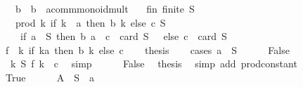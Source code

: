 \begin{isabellebody}
\ \ \ b\ {\isacharcolon}{\kern0pt}{\isacharcolon}{\kern0pt}\ {\isachardoublequoteopen}{\isacharprime}{\kern0pt}b\ {\isasymRightarrow}\ {\isacharprime}{\kern0pt}a{\isacharcolon}{\kern0pt}{\isacharcolon}{\kern0pt}comm{\isacharunderscore}{\kern0pt}monoid{\isacharunderscore}{\kern0pt}mult{\isachardoublequoteclose}\isanewline
\ \ \ fin{\isacharcolon}{\kern0pt}\ {\isachardoublequoteopen}finite\ S{\isachardoublequoteclose}\isanewline
\ \ \ {\isachardoublequoteopen}prod\ {\isacharparenleft}{\kern0pt}{\isasymlambda}k{\isachardot}{\kern0pt}\ if\ k\ {\isacharequal}{\kern0pt}\ a\ then\ b\ k\ else\ c{\isacharparenright}{\kern0pt}\ S\ {\isacharequal}{\kern0pt}\isanewline
\ \ \ \ {\isacharparenleft}{\kern0pt}if\ a\ {\isasymin}\ S\ then\ b\ a\ {\isacharasterisk}{\kern0pt}\ c\ {\isacharcircum}{\kern0pt}\ {\isacharparenleft}{\kern0pt}card\ S\ {\isacharminus}{\kern0pt}\ {}{\isacharparenright}{\kern0pt}\ else\ c\ {\isacharcircum}{\kern0pt}\ card\ S{\isacharparenright}{\kern0pt}{\isachardoublequoteclose}\isanewline
%
\isadelimproof
%
\endisadelimproof
%
\isatagproof
{}\isamarkupfalse%
\ {\isacharminus}{\kern0pt}\isanewline
\ \ \isamarkupfalse%
\ {\isacharquery}{\kern0pt}f\ {\isacharequal}{\kern0pt}\ {\isachardoublequoteopen}{\isacharparenleft}{\kern0pt}{\isasymlambda}k{\isachardot}{\kern0pt}\ if\ k{\isacharequal}{\kern0pt}a\ then\ b\ k\ else\ c{\isacharparenright}{\kern0pt}{\isachardoublequoteclose}\isanewline
\ \ \isamarkupfalse%
\ {\isacharquery}{\kern0pt}thesis\isanewline
\ \ \isamarkupfalse%
\ {\isacharparenleft}{\kern0pt}cases\ {\isachardoublequoteopen}a\ {\isasymin}\ S{\isachardoublequoteclose}{\isacharparenright}{\kern0pt}\isanewline
\ \ \ \ \isamarkupfalse%
\ False\isanewline
\ \ \ \ \isamarkupfalse%
\ \isamarkupfalse%
\ {\isachardoublequoteopen}{\isasymforall}\ k{\isasymin}\ S{\isachardot}{\kern0pt}\ {\isacharquery}{\kern0pt}f\ k\ {\isacharequal}{\kern0pt}\ c{\isachardoublequoteclose}\ \isamarkupfalse%
\ simp\isanewline
\ \ \ \ \isamarkupfalse%
\ False\ \isamarkupfalse%
\ {\isacharquery}{\kern0pt}thesis\ \isamarkupfalse%
\ {\isacharparenleft}{\kern0pt}simp\ add{\isacharcolon}{\kern0pt}\ prod{\isacharunderscore}{\kern0pt}constant{\isacharparenright}{\kern0pt}\isanewline
\ \ \isamarkupfalse%
\isanewline
\ \ \ \ \isamarkupfalse%
\ True\isanewline
\ \ \ \ \isamarkupfalse%
\ {\isacharquery}{\kern0pt}A\ {\isacharequal}{\kern0pt}\ {\isachardoublequoteopen}S\ {\isacharminus}{\kern0pt}\ {\isacharbraceleft}{\kern0pt}a{\isacharbraceright}{\kern0pt}{\isachardoublequoteclose}\isanewline

\end{isabellebody}
